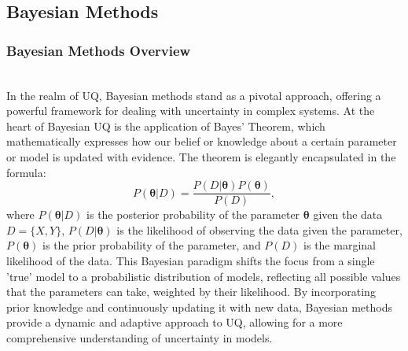 \subsection{Bayesian Methods}
\subsubsection{Bayesian Methods Overview}\hfill\\
In the realm of UQ, Bayesian methods stand as a pivotal approach, offering a powerful framework for dealing with uncertainty in complex systems. 
At the heart of Bayesian UQ is the application of Bayes' Theorem, which mathematically expresses how our belief or knowledge about a certain parameter or model is updated with evidence. 
The theorem is elegantly encapsulated in the formula: 
\begin{equation}
    \label{eq:Bayes_Theorem}
    P(\boldsymbol{\theta}|D)=\frac{P(D|\boldsymbol{\theta})P(\boldsymbol{\theta})}{P(D)},
\end{equation}
where $P(\boldsymbol{\theta}|D)$ is the posterior probability of the parameter $\boldsymbol{\theta}$ given the data $D=\{X,Y\}$, $P(D|\boldsymbol{\theta})$ is the likelihood of observing the data given the parameter, $P(\boldsymbol{\theta})$ is the prior probability of the parameter, and $P(D)$ is the marginal likelihood of the data. 
This Bayesian paradigm shifts the focus from a single 'true' model to a probabilistic distribution of models, reflecting all possible values that the parameters can take, weighted by their likelihood. 
By incorporating prior knowledge and continuously updating it with new data, Bayesian methods provide a dynamic and adaptive approach to UQ, allowing for a more comprehensive understanding of uncertainty in models.

